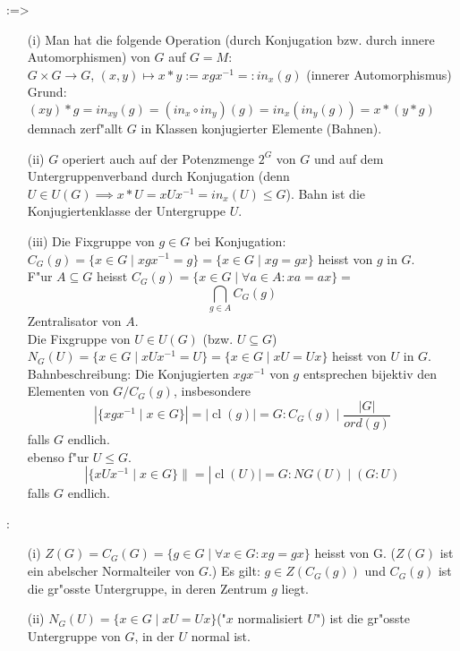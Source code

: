:{}=>{
  \begin{enumerate}
  \item[(i)] Man hat die folgende Operation (durch Konjugation bzw. 
           durch innere Automorphismen) von $G$ auf $G=M$: \\
		   $G\times G \longrightarrow G$, $(x,y) \mapsto x*y := xgx^{-1}=: in_x(g)$ (innerer
		   Automorphismus) \\
		   Grund: $(xy)*g=in_{xy}(g)=(in_x\circ in_y)(g)=in_x(in_y(g))=x*(y*g)$ \\
		   demnach zerf"allt $G$ in Klassen konjugierter Elemente (Bahnen).
 \item[(ii)]$G$ operiert auch auf der Potenzmenge $2^G$ von $G$	 und auf 
           dem Untergruppenverband durch Konjugation (denn $U\in U(G) \implies x*U
		   =xUx^{-1}=in_x(U) \leq G$). Bahn ist die Konjugiertenklasse der Untergruppe $U$.   
 \item[(iii)]Die Fixgruppe von $g\in G$ bei Konjugation: \\
           $C_G(g)=\{x\in G\mid xgx^{-1}=g\} =\{x\in G \mid xg=gx\}$ heisst {} 
		   von $g$ in $G$. \\
		   F"ur $A \subseteq G$ heisst $C_G(g) = \{x\in G\mid \forall a\in A: xa=ax\}=$
		   \[\bigcap_{g\in A} C_G(g) \] Zentralisator von $A$.	\\
		   Die Fixgruppe von $U\in U(G)$ (bzw. $U\subseteq G$) \\ 
		   $N_G(U)=\{x\in G\mid xUx^{-1}=U\}
		   =\{x\in G\mid xU=Ux\}$ heisst {\emph {}} von $U$ in $G$.\\
		   Bahnbeschreibung: Die Konjugierten $xgx^{-1}$ von $g$ entsprechen
		   bijektiv den Elementen von $G/C_G(g)$, insbesondere
		   \[|\{xgx^{-1}\mid x\in G\}|=|\operatorname{cl}(g)|=G:C_G(g) \mid \frac{|G|}{ord(g)} \] falls $G$ endlich. \\
		   ebenso f"ur $U\leq G$.
		   \[|\{xUx^{-1}\mid x\in G\}\|=|\operatorname{cl}(U)|=G:NG(U) \mid (G:U)\]
		   falls $G$ endlich.\\
\end{enumerate}
  }
\remark{}:{
\begin{enumerate}
  \item[(i)]$Z(G)=C_G(G)=\{g\in G\mid \forall x\in G: xg=gx\}$ heisst  von G.
       ($Z(G)$ ist ein abelscher Normalteiler von $G$.) Es gilt: $g\in Z(C_G(g))$ und
	   $C_G(g)$ ist die gr"osste Untergruppe, in deren Zentrum $g$ liegt.
  \item[(ii)]$N_G(U)=\{x\in G\mid xU=Ux\}$("$x$ normalisiert $U$") ist die gr"osste Untergruppe
       von $G$, in der $U$ normal ist.
\end{enumerate}
  }  
